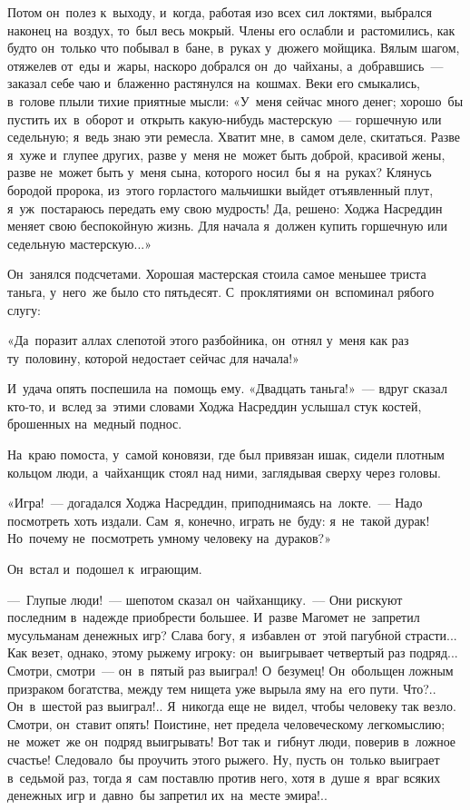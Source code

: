 \documentclass[12pt,a4paper]{book}
\begin{document}
Потом он~полез к~выходу, и~когда, работая изо всех сил локтями, выбрался наконец на~воздух, то~был весь мокрый. Члены его ослабли и~растомились, как будто он~только что побывал в~бане, в~руках у~дюжего мойщика. Вялым шагом, отяжелев от~еды и~жары, наскоро добрался он~до~чайханы, а~добравшись~— заказал себе чаю и~блаженно растянулся на~кошмах. Веки его смыкались, в~голове плыли тихие приятные мысли: «У~меня сейчас много денег; хорошо~бы пустить их~в~оборот и~открыть какую-нибудь мастерскую~— горшечную или седельную; я~ведь знаю эти ремесла. Хватит мне, в~самом деле, скитаться. Разве я~хуже и~глупее других, разве у~меня не~может быть доброй, красивой жены, разве не~может быть у~меня сына, которого носил~бы я~на~руках? Клянусь бородой пророка, из~этого горластого мальчишки выйдет отъявленный плут, я~уж~постараюсь передать ему свою мудрость! Да, решено: Ходжа Насреддин меняет свою беспокойную жизнь. Для начала я~должен купить горшечную или седельную мастерскую...»

Он~занялся подсчетами. Хорошая мастерская стоила самое меньшее триста таньга, у~него~же было сто пятьдесят. С~проклятиями он~вспоминал рябого слугу:

«Да~поразит аллах слепотой этого разбойника, он~отнял у~меня как раз ту~половину, которой недостает сейчас для начала!»

И~удача опять поспешила на~помощь ему. «Двадцать таньга!»~— вдруг сказал кто-то, и~вслед за~этими словами Ходжа Насреддин услышал стук костей, брошенных на~медный поднос.

На~краю помоста, у~самой коновязи, где был привязан ишак, сидели плотным кольцом люди, а~чайханщик стоял над ними, заглядывая сверху через головы.

«Игра!~— догадался Ходжа Насреддин, приподнимаясь на~локте.~— Надо посмотреть хоть издали. Сам~я, конечно, играть не~буду: я~не~такой дурак! Но~почему не~посмотреть умному человеку на~дураков?»

Он~встал и~подошел к~играющим.

—~Глупые люди!~— шепотом сказал он~чайханщику.~— Они рискуют последним в~надежде приобрести большее. И~разве Магомет не~запретил мусульманам денежных игр? Слава богу, я~избавлен от~этой пагубной страсти... Как везет, однако, этому рыжему игроку: он~выигрывает четвертый раз подряд... Смотри, смотри~— он~в~пятый раз выиграл! О~безумец! Он~обольщен ложным призраком богатства, между тем нищета уже вырыла яму на~его пути. Что?.. Он~в~шестой раз выиграл!.. Я~никогда еще не~видел, чтобы человеку так везло. Смотри, он~ставит опять! Поистине, нет предела человеческому легкомыслию; не~может~же он~подряд выигрывать! Вот так и~гибнут люди, поверив в~ложное счастье! Следовало~бы проучить этого рыжего. Ну, пусть он~только выиграет в~седьмой раз, тогда я~сам поставлю против него, хотя в~душе я~враг всяких денежных игр и~давно~бы запретил их~на~месте эмира!..
\end{document}
